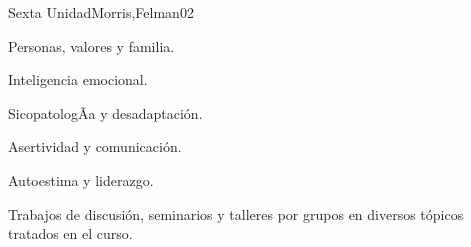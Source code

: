\begin{syllabus}
\begin{unit}{Sexta Unidad}{Morris,Felman}{0}{2}
\begin{topics}
	\item Personas, valores y familia.
	\item Inteligencia emocional.
	\item SicopatologÃ­a y desadaptación.
	\item Asertividad y comunicación.
	\item Autoestima y liderazgo.
\end{topics}
\begin{unitgoals}
	\item Trabajos de discusión, seminarios y talleres por grupos en diversos tópicos tratados en el curso.
\end{unitgoals}
\end{unit}



\begin{coursebibliography}
\end{coursebibliography}

\end{syllabus}
